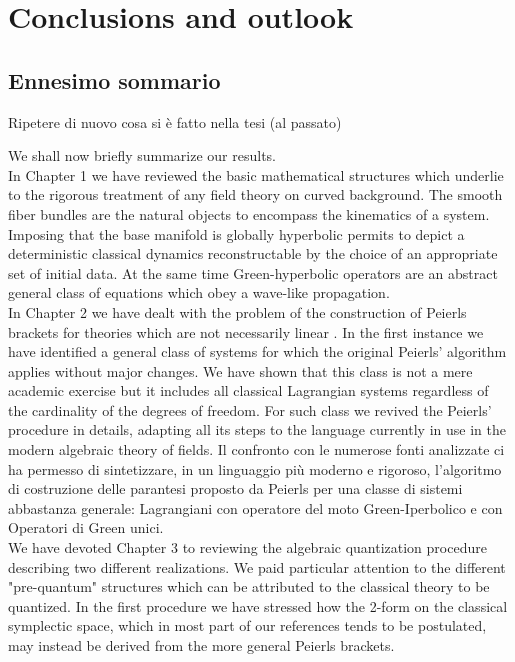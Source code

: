 \documentclass[Main]{subfiles}
\begin{document}
\chapter*{Conclusions and outlook}
\ifToninus
\section{Ennesimo sommario}
	Ripetere di nuovo cosa si è fatto nella tesi (al passato)
		
\fi
We shall now briefly summarize our results.
\\
In Chapter 1 we have reviewed the basic mathematical structures which underlie to the rigorous treatment of any field theory on curved background. The smooth fiber bundles are the natural objects to encompass the kinematics of a system.
Imposing that the base manifold is globally hyperbolic permits to depict a deterministic classical dynamics reconstructable  by the choice of an appropriate set of initial data.
At the same time Green-hyperbolic operators are an abstract general class of equations which obey a wave-like propagation.
\\
In Chapter 2 we have dealt with the problem of the construction of Peierls brackets for theories which are not necessarily linear .
In the first instance we have identified a general class of systems for which the original Peierls' algorithm applies without major changes. We have shown that this class is not a mere academic exercise but it includes all classical Lagrangian systems regardless of the cardinality of the degrees of freedom.
For such class we revived the Peierls' procedure in details, adapting all its steps to the language currently in use in the modern algebraic theory of fields.
\ifToninus
	Il confronto con le numerose fonti analizzate ci ha permesso di sintetizzare, in un linguaggio più moderno e rigoroso,  l'algoritmo  di costruzione  delle parantesi proposto da Peierls per una classe di sistemi abbastanza generale: Lagrangiani con operatore del moto Green-Iperbolico e con Operatori di Green unici.
\fi
\\
We have devoted Chapter 3 to reviewing the algebraic quantization procedure describing two different realizations.
We paid particular attention to the different "pre-quantum" structures which can be attributed to the classical theory to be quantized.
In the first procedure we have stressed how the 2-form on the classical symplectic space, which in most part of our references tends to be postulated, may instead be derived from the more general Peierls brackets.
\end{document}
